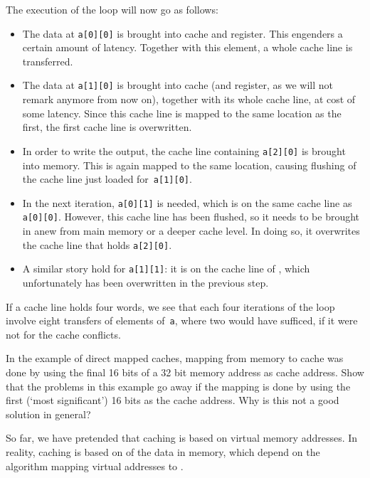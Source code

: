 The execution of the loop will now
go as follows:
\begin{itemize}
\item The data at \texttt{a[0][0]} is brought into cache and
  register. This engenders a certain amount of latency. Together with
  this element, a whole cache line is transferred.
\item The data at \texttt{a[1][0]} is brought into cache (and
  register, as we will not remark anymore from now on), together
  with its whole cache line, at cost of some latency. Since this cache
  line is mapped to the same location as the first, the first cache
  line is overwritten.
\item In order to write the output, the cache line containing
  \texttt{a[2][0]} is brought into memory. This is again mapped to the
  same location, causing flushing of the cache line just loaded
  for~\texttt{a[1][0]}.
\item In the next iteration, \texttt{a[0][1]} is needed, which is
  on the same cache line as \texttt{a[0][0]}. However, this cache line
  has been flushed, so it needs to be brought in anew from main memory
  or a deeper cache level. In doing so, it overwrites the cache line
  that holds \texttt{a[2][0]}.
\item A similar story hold for \texttt{a[1][1]}: it is on the cache
  line of , which unfortunately has been overwritten in
  the previous step.
\end{itemize}
If a cache line holds four words, we see that each four iterations of
the loop involve eight transfers of elements of~\texttt{a}, where two
would have sufficed, if it were not for the cache conflicts.

\begin{exercise}
  In the example of direct mapped caches, mapping from memory to cache
  was done by using the final 16 bits of a 32 bit memory address as
  cache address. Show that the problems in this example go away if the
  mapping is done by using the first (`most significant') 16 bits as
  the cache address. Why is this not a good solution in general?
\end{exercise}

\begin{remark}
  So far, we have pretended that caching is based on virtual memory
  addresses. In reality, caching is based on  of the data in memory, which depend on the algorithm
  mapping virtual addresses to .
\end{remark}

